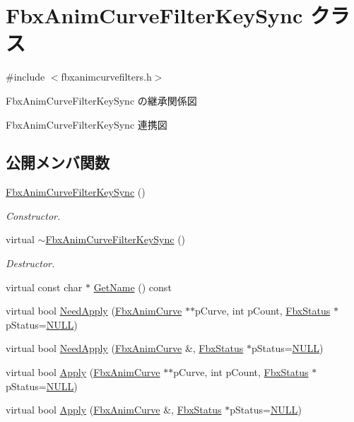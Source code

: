 \hypertarget{class_fbx_anim_curve_filter_key_sync}{}\section{Fbx\+Anim\+Curve\+Filter\+Key\+Sync クラス}
\label{class_fbx_anim_curve_filter_key_sync}


{\ttfamily \#include $<$fbxanimcurvefilters.\+h$>$}



Fbx\+Anim\+Curve\+Filter\+Key\+Sync の継承関係図


Fbx\+Anim\+Curve\+Filter\+Key\+Sync 連携図
\subsection*{公開メンバ関数}
\begin{DoxyCompactItemize}
\item 
\hyperlink{class_fbx_anim_curve_filter_key_sync_ad9ffdb980ce6b78a53a5447c2e7d61d9}{Fbx\+Anim\+Curve\+Filter\+Key\+Sync} ()
\begin{DoxyCompactList}\small\item\em Constructor. \end{DoxyCompactList}\item 
virtual \hyperlink{class_fbx_anim_curve_filter_key_sync_a4435b8ba11b1978833538f18405811fb}{$\sim$\+Fbx\+Anim\+Curve\+Filter\+Key\+Sync} ()
\begin{DoxyCompactList}\small\item\em Destructor. \end{DoxyCompactList}\item 
virtual const char $\ast$ \hyperlink{class_fbx_anim_curve_filter_key_sync_acf561aadd8d5f4b35826044c6d50b6b4}{Get\+Name} () const
\item 
virtual bool \hyperlink{class_fbx_anim_curve_filter_key_sync_aa26aa6ed4121353882589902fb0db961}{Need\+Apply} (\hyperlink{class_fbx_anim_curve}{Fbx\+Anim\+Curve} $\ast$$\ast$p\+Curve, int p\+Count, \hyperlink{class_fbx_status}{Fbx\+Status} $\ast$p\+Status=\hyperlink{fbxarch_8h_a070d2ce7b6bb7e5c05602aa8c308d0c4}{N\+U\+LL})
\item 
virtual bool \hyperlink{class_fbx_anim_curve_filter_key_sync_a5f255ee33fe2ecad8c61562931840c01}{Need\+Apply} (\hyperlink{class_fbx_anim_curve}{Fbx\+Anim\+Curve} \&, \hyperlink{class_fbx_status}{Fbx\+Status} $\ast$p\+Status=\hyperlink{fbxarch_8h_a070d2ce7b6bb7e5c05602aa8c308d0c4}{N\+U\+LL})
\item 
virtual bool \hyperlink{class_fbx_anim_curve_filter_key_sync_aa42855bf1a2c78e9d7392bdc48d99881}{Apply} (\hyperlink{class_fbx_anim_curve}{Fbx\+Anim\+Curve} $\ast$$\ast$p\+Curve, int p\+Count, \hyperlink{class_fbx_status}{Fbx\+Status} $\ast$p\+Status=\hyperlink{fbxarch_8h_a070d2ce7b6bb7e5c05602aa8c308d0c4}{N\+U\+LL})
\item 
virtual bool \hyperlink{class_fbx_anim_curve_filter_key_sync_acc77ba686024c5f204e9e78e52dc15f5}{Apply} (\hyperlink{class_fbx_anim_curve}{Fbx\+Anim\+Curve} \&, \hyperlink{class_fbx_status}{Fbx\+Status} $\ast$p\+Status=\hyperlink{fbxarch_8h_a070d2ce7b6bb7e5c05602aa8c308d0c4}{N\+U\+LL})
\end{DoxyCompactItemize}
